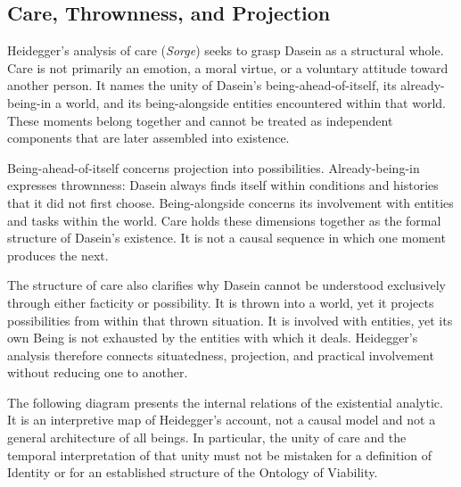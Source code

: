 \subsection{Care, Thrownness, and Projection}
\label{subsec:ch08-heidegger-care}

\label{para:VS.B01.P01.C08.S11.SS08.P001}

Heidegger's analysis of care (\textit{Sorge}) seeks to
grasp Dasein as a structural whole. Care is not
primarily an emotion, a moral virtue, or a voluntary
attitude toward another person. It names the unity
of Dasein's being-ahead-of-itself, its already-being-in
a world, and its being-alongside entities encountered
within that world. These moments belong together
and cannot be treated as independent components
that are later assembled into existence.
\cite[§§39--42]{HeideggerBeingTime}

\label{para:VS.B01.P01.C08.S11.SS08.P002}

Being-ahead-of-itself concerns projection into
possibilities. Already-being-in expresses thrownness:
Dasein always finds itself within conditions and
histories that it did not first choose. Being-alongside
concerns its involvement with entities and tasks
within the world. Care holds these dimensions together
as the formal structure of Dasein's existence.
It is not a causal sequence in which one moment
produces the next.
\cite[§41]{HeideggerBeingTime}

\label{para:VS.B01.P01.C08.S11.SS08.P003}

The structure of care also clarifies why Dasein cannot
be understood exclusively through either facticity
or possibility. It is thrown into a world, yet it
projects possibilities from within that thrown
situation. It is involved with entities, yet its
own Being is not exhausted by the entities with
which it deals. Heidegger's analysis therefore
connects situatedness, projection, and practical
involvement without reducing one to another.

\label{para:VS.B01.P01.C08.S11.SS08.P004}

The following diagram presents the internal relations
of the existential analytic. It is an interpretive
map of Heidegger's account, not a causal model and
not a general architecture of all beings. In particular,
the unity of care and the temporal interpretation
of that unity must not be mistaken for a definition
of Identity or for an established structure of
the Ontology of Viability.

